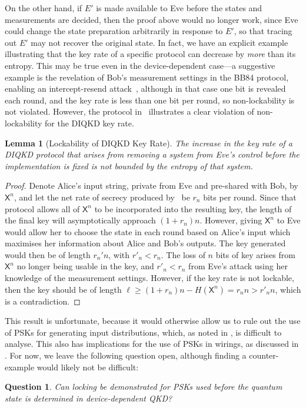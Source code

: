 \documentclass[10pt, a4paper]{article}
\numberwithin{equation}{section} %
\newcounter{stmt} %
\theoremstyle{definition}
\theoremstyle{plain}
\newtheorem{question}{Question}
\newtheorem{lemma}[stmt]{Lemma}
\newcommand{\?}{\mathrel{?}} %
\newcommand{\crv}[1]{\mathsf{#1}}
\begin{document}
            On the other hand, if \(E'\) is made available to Eve before the states and measurements are decided, then the proof above would no longer work, since Eve could change the state preparation arbitrarily in response to \(E'\), so that tracing out \(E'\) may not recover the original state. In fact, we have an explicit example illustrating that the key rate of a specific protocol can decrease by \emph{more} than its entropy. This may be true even in the device-dependent case---a suggestive example is the revelation of Bob's measurement settings in the BB84 protocol, enabling an intercept-resend attack~\cite{PracticalQKD}, although in that case one bit is revealed each round, and the key rate is less than one bit per round, so non-lockability is not violated. However, the protocol in~\cite[Prot. 2]{DIQKD_FiniteSize} illustrates a clear violation of non-lockability for the DIQKD key rate.
            \begin{lemma}[Lockability of DIQKD Key Rate]\label{thm:dilock}
              The increase in the key rate of a DIQKD protocol that arises from removing a system from Eve's control \emph{before} the implementation is fixed is not bounded by the entropy of that system.
            \end{lemma}
            \begin{proof}
              Denote Alice's input string, private from Eve and pre-shared with Bob, by \(\crv{X}^n\), and let the net rate of secrecy produced by~\cite[Prot. 2]{DIQKD_FiniteSize} be \(r_n\) bits per round. Since that protocol allows all of \(\crv{X}^n\) to be incorporated into the resulting key, the length of the final key will asymptotically approach \((1+r_n)n\). However, giving \(\crv{X}^n\) to Eve would allow her to choose the state in each round based on Alice's input which maximises her information about Alice and Bob's outputs. The key generated would then be of length \(r_n'n\), with \(r'_n < r_n\). The loss of \(n\) bits of key arises from \(\crv{X}^n\) no longer being usable in the key, and \(r'_n < r_n\) from Eve's attack using her knowledge of the measurement settings. However, if the key rate is not lockable, then the key should be of length \(\ell \geq (1+r_n)n - H(\crv{X}^n) = r_nn > r'_nn\), which is a contradiction.
            \end{proof}

            This result is unfortunate, because it would otherwise allow us to rule out the use of PSKs for generating input distributions, which, as noted in , is difficult to analyse. This also has implications for the use of PSKs in wirings, as discussed in . For now, we leave the following question open, although finding a counter-example would likely not be difficult:
            \begin{question}
              Can locking be demonstrated for PSKs used before the quantum state is determined in device-dependent QKD\@?
            \end{question}
\end{document}
